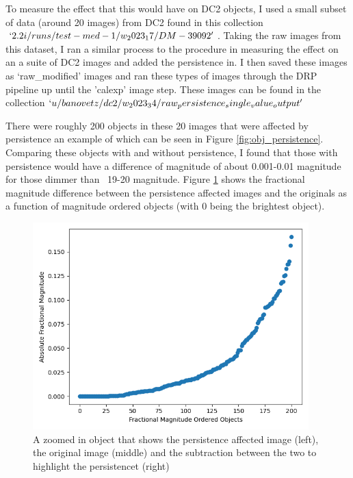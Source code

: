 \documentclass[DM,authoryear,toc]{lsstdoc}
\begin{document}
To measure the effect that this would have on DC2 objects, I used a small subset of data (around 20 images) from DC2 
found in this collection \texttt{$`2.2i/runs/test-med-1/w_2023_17/DM-39092'$}. 
Taking the raw images from this dataset, 
I ran a similar process to the procedure in measuring the effect on an a suite of DC2 images and added the persistence in. 
I then saved these images as `raw_modified' images and ran these types of images through the DRP pipeline up until the 'calexp' image step.
These images can be found in the collection \texttt{$`u/banovetz/dc2/w_2023_34/raw_persistence_single_value_output'$}

There were roughly 200 objects in these 20 images that were affected by persistence an example of which can be seen in Figure \ref{fig:obj_persistence}.
Comparing these objects with and without persistence, 
I found that those with persistence would have a difference of magnitude of about 0.001-0.01 magnitude for those dimmer than ~19-20 magnitude. 
Figure \ref{fig:absolute_fractional_flux} shows the fractional magnitude difference between the persistence affected images and the originals
 as a function of magnitude ordered objects (with 0 being the brightest object).

\begin{figure}[!htp]
  \centering
  \includegraphics[width=0.95\textwidth, angle=0]{Absolute_Fractional_Magnitude.png}
  \caption{
  A zoomed in object that shows the persistence affected image (left), the original image (middle) 
  and the subtraction between the two to highlight the persistencet (right)
  }
\label{fig:absolute_fractional_flux}
\end{figure}
\end{document}
